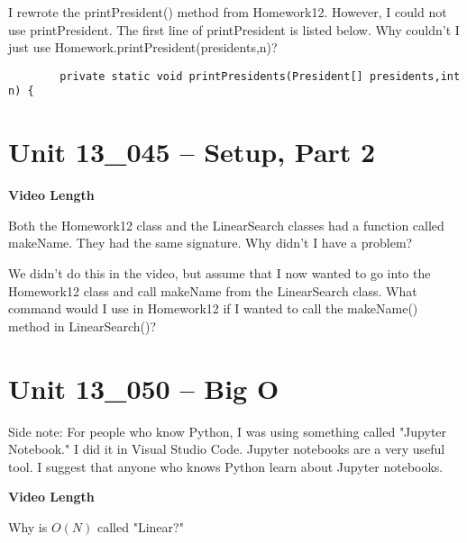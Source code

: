 \documentclass[letterpaper,12pt]{exam}
\newcommand{\unit}{Unit 13}
\begin{document}
\begin{questions}
\begin{samepage}
    \question I rewrote the printPresident() method from Homework12.  However, I could not use printPresident.  The first line of printPresident is listed below.  Why couldn't I just use Homework.printPresident(presidents,n)?
    \begin{verbatim}
        private static void printPresidents(President[] presidents,int n) {
    \end{verbatim}
    \vspace{5mm}
\end{samepage}

\section*{\unit\_045 -- Setup, Part 2} 
\par{\selectfont\textbf{Video Length }}

\begin{samepage}
    \question Both the Homework12 class and the LinearSearch classes had a function called makeName.  They had the same signature. Why didn't I have a problem? 
    \vspace{5mm}
\end{samepage}
\begin{samepage}
    \question We didn't do this in the video, but assume that I now wanted to go into the Homework12 class and call makeName from the LinearSearch class.  What command would I use in Homework12 if I wanted to call the makeName() method in LinearSearch()?
    \vspace{5mm}
\end{samepage}

\section*{\unit\_050 -- Big O} 

Side note:  For people who know Python, I was using something called "Jupyter Notebook."  I did it in Visual Studio Code.  Jupyter notebooks are a very useful tool.  I suggest that anyone who knows Python learn about Jupyter notebooks.

\par{\selectfont\textbf{Video Length }}
\begin{samepage}
    \question Why is $O(N)$ called "Linear?"
    \vspace{5mm}
\end{samepage}


\end{questions}
\end{document}
